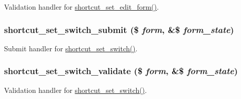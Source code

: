\label{shortcut_8admin_8inc_ad666de226110fe05591951034928b39d}
Validation handler for \hyperlink{group__forms_gaaa9ef77c9928065c19fd0177ecb611b1}{shortcut\_\-set\_\-edit\_\-form()}. \hypertarget{shortcut_8admin_8inc_a0fbc329e8a567e9364a54e57ce31ee04}{
\subsubsection[{shortcut\_\-set\_\-switch\_\-submit}]{\setlength{\rightskip}{0pt plus 5cm}shortcut\_\-set\_\-switch\_\-submit (\$ {\em form}, \/  \&\$ {\em form\_\-state})}}
\label{shortcut_8admin_8inc_a0fbc329e8a567e9364a54e57ce31ee04}
Submit handler for \hyperlink{group__forms_ga9ec510e2dad9820993309247e6a50bd7}{shortcut\_\-set\_\-switch()}. \hypertarget{shortcut_8admin_8inc_ad9a4a7bd86add86452fdae0d123704a5}{
\subsubsection[{shortcut\_\-set\_\-switch\_\-validate}]{\setlength{\rightskip}{0pt plus 5cm}shortcut\_\-set\_\-switch\_\-validate (\$ {\em form}, \/  \&\$ {\em form\_\-state})}}
\label{shortcut_8admin_8inc_ad9a4a7bd86add86452fdae0d123704a5}
Validation handler for \hyperlink{group__forms_ga9ec510e2dad9820993309247e6a50bd7}{shortcut\_\-set\_\-switch()}. 
